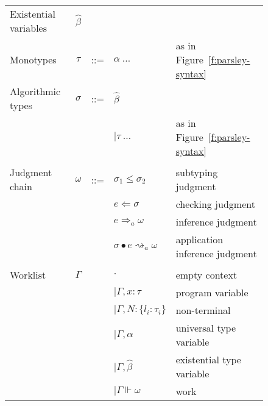 \documentclass[letterpaper]{article}
\newcommand{\utv}{\alpha}             %
\newcommand{\etv}{\widehat{\beta}}    %
\begin{document}
\begin{figure}
  \begin{tabular}{l c l l l}
    Existential variables     & $\etv$   &     &                                   & \\
    Monotypes                 & $\tau$   & ::= & $ \utv\ \ldots $                  & as in Figure~\ref{f:parsley-syntax} \\
    Algorithmic types         & $\sigma$ & ::= & $ \etv $                          & \\
                              &          &     & $ \mid \tau\ \ldots $             & as in Figure~\ref{f:parsley-syntax} \\
                              &          &     &                                   & \\
    Judgment chain            & $\omega$ & ::= & $ \sigma_1\leq\sigma_2 $          & subtyping judgment \\
                              &          &     & $ e\Leftarrow\sigma $             & checking judgment \\
                              &          &     & $ e\Rightarrow_a\omega $          & inference judgment \\
                              &          &     & $ \sigma\bullet e\rightsquigarrow_a\omega $ & application inference judgment \\
                              &          &     &                                   & \\
    Worklist                  & $\Gamma$ &     & $ \cdot $                         & empty context \\
                              &          &     & $ \mid\Gamma, x: \tau $           & program variable \\
                              &          &     & $ \mid\Gamma, N: \{l_i:\tau_i\} $ & non-terminal \\
                              &          &     & $ \mid\Gamma, \utv $              & universal type variable \\
                              &          &     & $ \mid\Gamma, \etv  $             & existential type variable\\
                              &          &     & $ \mid\Gamma\Vdash\omega $        & work \\


\end{tabular}
\end{figure}
\end{document}
